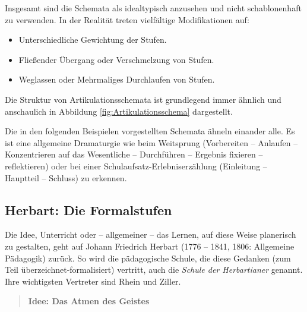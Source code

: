 \mip
Insgesamt sind die Schemata als idealtypisch anzusehen und
nicht schablonenhaft zu verwenden.
In der Realit\"{a}t treten vielf\"{a}ltige Modifikationen auf:
\begin{itemize}
	\item
	Unterschiedliche Gewichtung der Stufen.
	\item
	Flie{\ss}ender \"{U}bergang oder Verschmelzung von Stufen.
	\item
	Weglassen oder Mehrmaliges Durchlaufen von Stufen.
\end{itemize}


Die Struktur von Artikulationsschemata ist grundlegend immer \"{a}hnlich und anschaulich in Abbildung \ref{fig:Artikulationsschema} dargestellt.

\mip
Die in den folgenden Beispielen vorgestellten Schemata \"{a}hneln
einander alle. Es ist eine allgemeine Dramaturgie
wie beim Weitsprung (Vorbereiten -- Anlaufen -- Konzentrieren
auf das Wesentliche -- Durchf\"{u}hren -- Ergebnis fixieren --
reflektieren) oder bei einer
Schulaufsatz-Erlebniserz\"{a}hlung (Einleitung -- Hauptteil -- Schluss) zu erkennen.

\subsection{Herbart: Die Formalstufen}
Die Idee, Unterricht oder -- allgemeiner -- das Lernen, auf diese
Weise planerisch zu gestalten, geht auf Johann Friedrich
Herbart (1776 -- 1841, 1806: Allgemeine P\"{a}dagogik) zur\"{u}ck.
So wird die p\"{a}dagogische Schule, die diese Gedanken (zum Teil
\"{u}berzeichnet-formalisiert) vertritt,
auch die {\em Schule der Herbartianer} genannt.
Ihre wichtigsten Vertreter sind Rhein und Ziller.

\begin{quote}
	\bf Idee: Das Atmen des Geistes
\end{quote}

